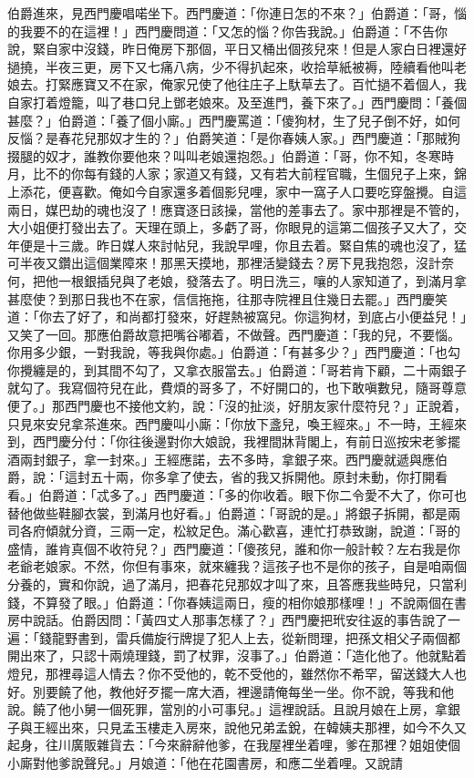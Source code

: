 \begin{showcontents}{}
伯爵進來，見西門慶唱喏坐下。西門慶道：「你連日怎的不來？」伯爵道：「哥，惱的我要不的在這裡！」西門慶問道：「又怎的惱？你告我說。」伯爵道：「不告你說，緊自家中沒錢，昨日俺房下那個，平日又桶出個孩兒來！但是人家白日裡還好撾撓，半夜三更，房下又七痛八病，少不得扒起來，收拾草紙被褥，陸續看他叫老娘去。打緊應寶又不在家，俺家兄使了他往庄子上馱草去了。百忙撾不着個人，我自家打着燈籠，叫了巷口兒上鄧老娘來。及至進門，養下來了。」西門慶問：「養個甚麼？」伯爵道：「養了個小廝。」西門慶罵道：「傻狗材，生了兒子倒不好，如何反惱？是春花兒那奴才生的？」伯爵笑道：「是你春姨人家。」西門慶道：「那賊狗掇腿的奴才，誰教你要他來？叫叫老娘還抱怨。」伯爵道：「哥，你不知，冬寒時月，比不的你每有錢的人家；家道又有錢，又有若大前程官職，生個兒子上來，錦上添花，便喜歡。俺如今自家還多着個影兒哩，家中一窩子人口要吃穿盤攪。自這兩日，媒巴劫的魂也沒了！應寶逐日該操，當他的差事去了。家中那裡是不管的，大小姐便打發出去了。天理在頭上，多虧了哥，你眼見的這第二個孩子又大了，交年便是十三歲。昨日媒人來討帖兒，我說早哩，你且去着。緊自焦的魂也沒了，猛可半夜又鑽出這個業障來！那黑天摸地，那裡活變錢去？房下見我抱怨，沒計奈何，把他一根銀插兒與了老娘，發落去了。明日洗三，嚷的人家知道了，到滿月拿甚麼使？到那日我也不在家，信信拖拖，往那寺院裡且住幾日去罷。」西門慶笑道：「你去了好了，和尚都打發來，好趕熱被窩兒。你這狗材，到底占小便益兒！」又笑了一回。那應伯爵故意把嘴谷嘟着，不做聲。西門慶道：「我的兒，不要惱。你用多少銀，一對我說，等我與你處。」伯爵道：「有甚多少？」西門慶道：「也勾你攪纏是的，到其間不勾了，又拿衣服當去。」伯爵道：「哥若肯下顧，二十兩銀子就勾了。我寫個符兒在此，費煩的哥多了，不好開口的，也下敢嗔數兒，隨哥尊意便了。」那西門慶也不接他文約，說：「沒的扯淡，好朋友家什麼符兒？」正說着，只見來安兒拿茶進來。西門慶叫小廝：「你放下盞兒，喚王經來。」不一時，王經來到，西門慶分付：「你往後邊對你大娘說，我裡間牀背閣上，有前日巡按宋老爹擺酒兩封銀子，拿一封來。」王經應諾，去不多時，拿銀子來。西門慶就遞與應伯爵，說：「這封五十兩，你多拿了使去，省的我又拆開他。原封未動，你打開看看。」伯爵道：「忒多了。」西門慶道：「多的你收着。眼下你二令愛不大了，你可也替他做些鞋腳衣裳，到滿月也好看。」伯爵道：「哥說的是。」將銀子拆開，都是兩司各府傾就分資，三兩一定，松紋足色。滿心歡喜，連忙打恭致謝，說道：「哥的盛情，誰肯真個不收符兒？」西門慶道：「傻孩兒，誰和你一般計較？左右我是你老爺老娘家。不然，你但有事來，就來纏我？這孩子也不是你的孩子，自是咱兩個分養的，實和你說，過了滿月，把春花兒那奴才叫了來，且答應我些時兒，只當利錢，不算發了眼。」伯爵道：「你春姨這兩日，瘦的相你娘那樣哩！」不說兩個在書房中說話。伯爵因問：「黃四丈人那事怎樣了？」西門慶把玳安往返的事告說了一遍：「錢龍野書到，雷兵備旋行牌提了犯人上去，從新問理，把孫文相父子兩個都開出來了，只認十兩燒理錢，罰了杖罪，沒事了。」伯爵道：「造化他了。他就點着燈兒，那裡尋這人情去？你不受他的，乾不受他的，雖然你不希罕，留送錢大人也好。別要饒了他，教他好歹擺一席大酒，裡邊請俺每坐一坐。你不說，等我和他說。饒了他小舅一個死罪，當別的小可事兒。」這裡說話。且說月娘在上房，拿銀子與王經出來，只見孟玉樓走入房來，說他兄弟孟銳，在韓姨夫那裡，如今不久又起身，往川廣販雜貨去：「今來辭辭他爹，在我屋裡坐着哩，爹在那裡？姐姐使個小廝對他爹說聲兒。」月娘道：「他在花園書房，和應二坐着哩。又說請
\end{showcontents}

